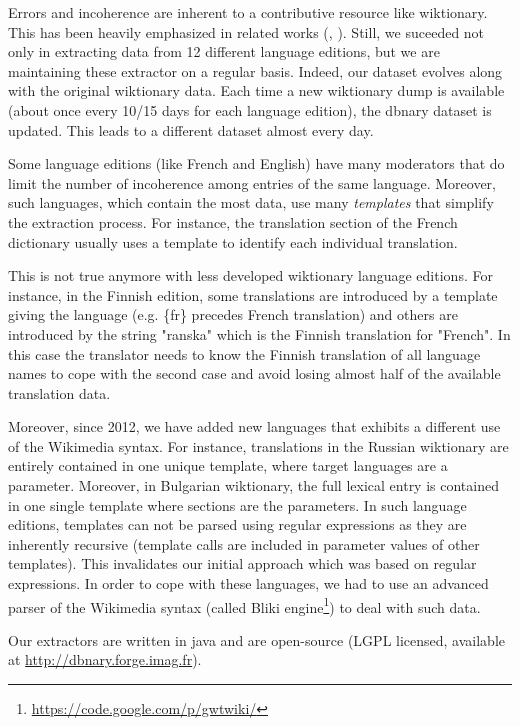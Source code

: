 \documentclass[10pt, a4paper]{article}
\begin{document}
Errors and incoherence are inherent to a contributive resource like wiktionary. This has been heavily emphasized in related works (\cite{HellmannSebastianandBrekleJonasandAuer}, \cite{TUD-CS-2012-0008}). Still, we suceeded not only in extracting data from 12 different language editions, but we are maintaining these extractor on a regular basis. Indeed, our dataset evolves along with the original wiktionary data. Each time a new wiktionary dump is available (about once every 10/15 days for each language edition), the dbnary dataset is updated. This leads to a different dataset almost every day.

Some language editions (like French and English) have many moderators that do limit the number of incoherence among entries of the same language. Moreover, such languages, which contain the most data, use many \textit{templates} that simplify the extraction process. For instance, the translation section of the French dictionary usually uses a template to identify each individual translation.

This is not true anymore with less developed wiktionary language editions. For instance, in the Finnish edition, some translations are introduced by a template giving the language (e.g. \{fr\} precedes French translation) and others are introduced by the string "ranska" which is the Finnish translation for "French". In this case the translator needs to know the Finnish translation of all language names to cope with the second case and avoid losing almost half of the available translation data.

Moreover, since 2012, we have added new languages that exhibits a different use of the Wikimedia syntax. For instance, translations in the Russian wiktionary are entirely contained in one unique template, where target languages are a parameter. Moreover, in Bulgarian wiktionary, the full lexical entry is contained in one single template where sections are the parameters. In such language editions, templates can not be parsed using regular expressions as they are inherently recursive (template calls are included in parameter values of other templates). This invalidates our initial approach which was based on regular expressions. In order to cope with these languages, we had to use an advanced parser of the Wikimedia syntax (called Bliki engine\footnote{\url{https://code.google.com/p/gwtwiki/}}) to deal with such data.

Our extractors are written in java and are open-source (LGPL licensed, available at \url{http://dbnary.forge.imag.fr}).
\end{document}
